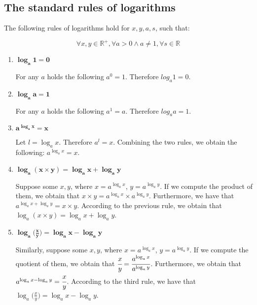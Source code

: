 \documentclass[10pt,a4paper]{article}
\begin{document}

\newpage

\subsection{The standard rules of logarithms}


The following rules of logarithms hold for $x,y,a,s$, such that:

\[\forall x,y \in\mathbb{R^+}, \forall a > 0 \land a \neq 1, \forall s \in\mathbb{R}\]

\begin{enumerate}
    \item{$\boldsymbol{\log_a 1 = 0}$}  %

    For any $a$ holds the following $a^0 = 1$. Therefore $log_a 1 = 0$.
    
    \item{$\boldsymbol{\log_a a = 1}$}  %

    For any $a$ holds the following $a^1 = a$. Therefore $log_a a = 1$.

    \item{$\boldsymbol{a^{\log_a x} = x}$}  %

    Let $l = \log_a x$. Therefore $a^{l} = x$. Combining the two rules, we obtain the following:
    $a^{\log_a x} = x$.

    \item{$\boldsymbol{\log_a (x \times y) = \log_a x + \log_a y}$}  %
    
    Suppose some $x,y$, where $x = a^{\log_a x}$, $y = a^{\log_a y}$. If we compute the product
    of them, we obtain that $x \times y = a^{\log_a x} \times a^{\log_a y}$. Furthermore, we 
    have that $a^{\log_a x + \log_a y} = x \times y$. According to the previous rule, we 
    obtain that $\log_a (x \times y) = \log_a x + \log_a y$.

    \item{$\boldsymbol{\log_a \Big( \frac{x}{y} \Big) = \log_a x - \log_a y}$}  %
    
    Similarly, suppose some $x,y$, where $x = a^{\log_a x}$, $y = a^{\log_a y}$. If we compute 
    the quotient of them, we obtain that $\cfrac{x}{y} = \cfrac{a^{\log_a x}}{a^{\log_a y}}$. 
    Furthermore,  we obtain that $a^{\log_a x - \log_a y} = \cfrac{x}{y}$. According to the third 
    rule, we have that $\log_a \big(\frac{x}{y}\big) = \log_a x - \log_a y$.


\end{enumerate}
\end{document}
